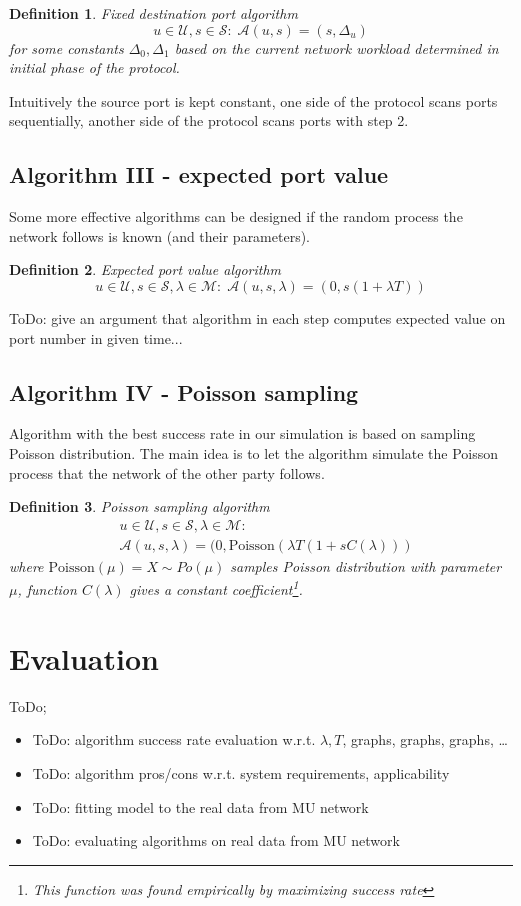 \documentclass[twoside]{article}
\newtheorem{mydef}{Definition}
\begin{document}
\begin{multicols}{2}
\begin{mydef}
Fixed destination port algorithm
\[
u \in \mathcal{U}, s \in \mathcal{S}: \;
\mathcal{A}(u, s) = (s, \Delta_u)
\] for some constants $\Delta_0, \Delta_1$ based on the current network workload determined in initial phase
of the protocol.
\end{mydef}

Intuitively the source port is kept constant, one side of the protocol scans ports sequentially, another
side of the protocol scans ports with step 2.

\subsection{Algorithm III - expected port value}
Some more effective algorithms can be designed if the random process the network follows is known (and their
parameters).

\begin{mydef}
Expected port value algorithm
\[
u \in \mathcal{U}, s \in \mathcal{S}, \lambda \in \mathcal{M}:\;
\mathcal{A}(u, s, \lambda) = (0, s(1 + \lambda T))
\]
\end{mydef}

ToDo: give an argument that algorithm in each step computes expected value on port number in given time...

\subsection{Algorithm IV - Poisson sampling}
Algorithm with the best success rate in our simulation is based on sampling Poisson distribution.
The main idea is to let the algorithm simulate the Poisson process that the network of the
other party follows. 

\begin{mydef}
Poisson sampling algorithm 
\begin{align*}
& u \in \mathcal{U}, s \in \mathcal{S}, \lambda \in \mathcal{M}:\\
& \mathcal{A}(u, s, \lambda) = (0, \text{Poisson}(\lambda T (1+s C(\lambda)))
\end{align*} where $\text{Poisson}(\mu) = X \sim Po(\mu)$ samples Poisson distribution with
parameter $\mu$, function $C(\lambda)$ gives a constant 
coefficient\footnote{This function was found empirically by maximizing success rate}.
\end{mydef}

\section{Evaluation}
ToDo;
\begin{itemize}
 \item ToDo: algorithm success rate evaluation w.r.t. $\lambda, T$, graphs, graphs, graphs, \dots
 \item ToDo: algorithm pros/cons w.r.t. system requirements, applicability
 \item ToDo: fitting model to the real data from MU network
 \item ToDo: evaluating algorithms on real data from MU network
\end{itemize}


\end{multicols}
\end{document}
